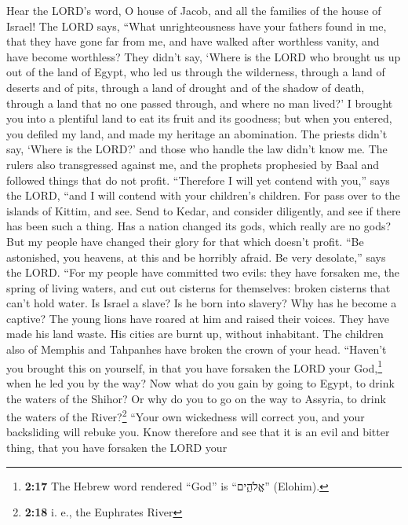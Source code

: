  Hear the LORD's word, O house of Jacob, and all the
families of the house of Israel!  The LORD says, ``What
unrighteousness have your fathers found in me, that they have gone far
from me, and have walked after worthless vanity, and have become
worthless?  They didn't say, `Where is the LORD who
brought us up out of the land of Egypt, who led us through the
wilderness, through a land of deserts and of pits, through a land of
drought and of the shadow of death, through a land that no one passed
through, and where no man lived?'  I brought you into a
plentiful land to eat its fruit and its goodness; but when you entered,
you defiled my land, and made my heritage an abomination. 
The priests didn't say, `Where is the LORD?' and those who handle the
law didn't know me. The rulers also transgressed against me, and the
prophets prophesied by Baal and followed things that do not profit.
 ``Therefore I will yet contend with you,'' says the LORD,
``and I will contend with your children's children.  For
pass over to the islands of Kittim, and see. Send to Kedar, and consider
diligently, and see if there has been such a thing.  Has
a nation changed its gods, which really are no gods? But my people have
changed their glory for that which doesn't profit.  ``Be
astonished, you heavens, at this and be horribly afraid. Be very
desolate,'' says the LORD.  ``For my people have
committed two evils: they have forsaken me, the spring of living waters,
and cut out cisterns for themselves: broken cisterns that can't hold
water.  Is Israel a slave? Is he born into slavery? Why
has he become a captive?  The young lions have roared at
him and raised their voices. They have made his land waste. His cities
are burnt up, without inhabitant.  The children also of
Memphis and Tahpanhes have broken the crown of your head.
 ``Haven't you brought this on yourself, in that you have
forsaken the LORD your God,\footnote{\textbf{2:17} The Hebrew word
  rendered ``God'' is ``אֱלֹהִ֑ים'' (Elohim).} when he led you by the
way?  Now what do you gain by going to Egypt, to drink
the waters of the Shihor? Or why do you to go on the way to Assyria, to
drink the waters of the River?\footnote{\textbf{2:18} i. e., the
  Euphrates River}  ``Your own wickedness will correct
you, and your backsliding will rebuke you. Know therefore and see that
it is an evil and bitter thing, that you have forsaken the LORD your
